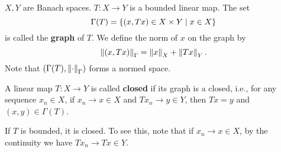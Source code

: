 \begin{definition}
    $X,Y$ are Banach spaces. $T:X\to Y$ is a bounded linear map. The set 
    \begin{equation*}
        \Gamma(T) = \Set{\pth{x,Tx}\in X\times Y}{x\in X}
    \end{equation*}
    is called the \textbf{graph} of $T$. We define the norm of $x$ on the graph by
    \begin{equation*}
        \left\lVert {(x,Tx)} \right\rVert_\Gamma = \left\lVert {x} \right\rVert_X + \left\lVert {Tx} \right\rVert_Y.
    \end{equation*}
    Note that $\pth{\Gamma(T), \norm{\cdot}_\Gamma}$ forms a normed space.
\end{definition}

\begin{definition}
    A linear map $T:X\to Y$ is called \textbf{closed} if its graph is a closed, 
    i.e., for any sequence $x_n\in X$, if $x_n\to x\in X$ and $Tx_n\to y\in Y$, 
    then $Tx = y$ and $(x,y)\in \Gamma(T)$.
\end{definition}
\begin{remark}
    If $T$ is bounded, it is closed. To see this, note that if $x_n\to x\in X$, 
    by the continuity we have $Tx_n\to Tx\in Y$. 
\end{remark}


